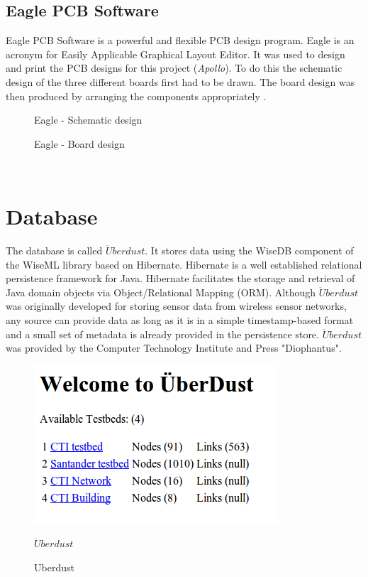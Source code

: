 \documentclass[12pt,a4paper,draft]{report}
\begin{document}
\subsection{Eagle PCB Software}
Eagle PCB Software is a powerful and flexible PCB design program. Eagle is an acronym for Easily Applicable Graphical Layout Editor. It was used to design and print the PCB designs for this project (\emph{Apollo}). To do this the schematic design of the three different boards first had to be drawn. The board design was then produced by arranging the components appropriately \cite{website:eagle}.
\begin{figure}[H]
\centering
    \caption{Eagle - Schematic design}

    \caption{Eagle - Board design}
\end{figure}
\ \\
\section{Database}
The database is called $\ddot{U}berdust$. It stores data using the WiseDB component of the WiseML library based on Hibernate. Hibernate is a well established relational persistence framework for Java. Hibernate facilitates the storage and retrieval of Java domain objects via Object/Relational Mapping (ORM). Although $\ddot{U}berdust$ was originally developed for storing sensor data from wireless sensor networks, any source can provide data as long as it is in a simple timestamp-based format and a small set of metadata is already provided in the persistence store. $\ddot{U}berdust$ was provided by the Computer Technology Institute and Press "Diophantus". \cite{website:database} \\
%
\begin{figure}[H]
\centering
    \includegraphics*[scale=0.4]{Uberdust}
    \caption{$\ddot{U}berdust$}

    \caption{Uberdust}
\end{figure}
\ \\
%
\newpage
%
\end{document}
